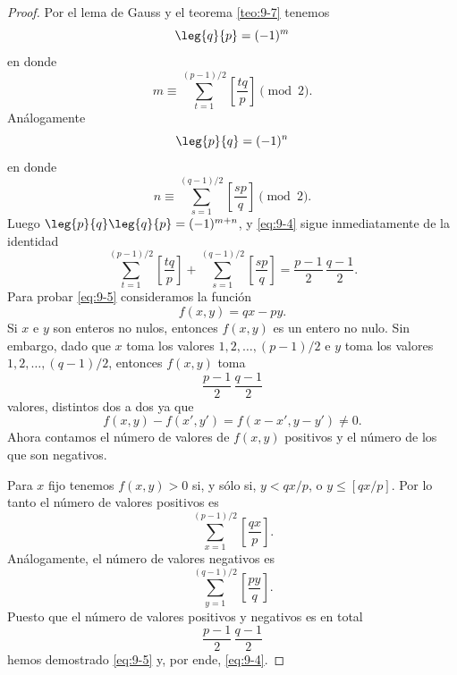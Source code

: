 \documentclass[12pt,a4paper]{book}
\begin{document}
    \begin{proof}
        Por el lema de Gauss y el teorema \ref{teo:9-7} tenemos
        \begin{equation*}
            \leg{q}{p}=(-1)^{m}
        \end{equation*}
        en donde
        \begin{equation*}
            m\equiv\sum_{t=1}^{(p-1)/2}\left[\frac{tq}{p}\right]\pmod{2}.
        \end{equation*}
        Análogamente
        \begin{equation*}
            \leg{p}{q}=(-1)^{n}
        \end{equation*}
        en donde
        \begin{equation*}
            n\equiv\sum_{s=1}^{(q-1)/2}\left[\frac{sp}{q}\right]\pmod{2}.
        \end{equation*}
        Luego $\leg{p}{q}\leg{q}{p}=(-1)^{m+n}$, y \eqref{eq:9-4} sigue inmediatamente de la
        identidad
        \begin{equation}\label{eq:9-5}
            \sum_{t=1}^{(p-1)/2}\left[\frac{tq}{p}\right]+\sum_{s=1}^{(q-1)/2}\left[\frac{sp}{q}\right]=\frac{p-1}{2}\,\frac{q-1}{2}.
        \end{equation}
        Para probar \eqref{eq:9-5} consideramos la función
        \begin{equation*}
            f(x,y)=qx-py.
        \end{equation*}
        Si $x$ e $y$ son enteros no nulos, entonces $f(x,y)$ es un entero no nulo. Sin
        embargo, dado que $x$ toma los valores $1,2,\dots,(p-1)/2$ e $y$ toma los valores
        $1,2,\dots,(q-1)/2$, entonces $f(x,y)$ toma
        \begin{equation*}
            \frac{p-1}{2}\,\frac{q-1}{2}
        \end{equation*}
        valores, distintos dos a dos ya que
        \begin{equation*}
            f(x,y)-f(x',y')=f(x-x',y-y')\neq0.
        \end{equation*}
        Ahora contamos el número de valores de $f(x,y)$ positivos y el número de los que
        son negativos.

        Para $x$ fijo tenemos $f(x,y)>0$ si, y sólo si, $y<qx/p$, o $y\leq[qx/p]$. Por lo
        tanto el número de valores positivos es
        \begin{equation*}
            \sum_{x=1}^{(p-1)/2}\left[\frac{qx}{p}\right].
        \end{equation*}
        Análogamente, el número de valores negativos es
        \begin{equation*}
            \sum_{y=1}^{(q-1)/2}\left[\frac{py}{q}\right].
        \end{equation*}
        Puesto que el número de valores positivos y negativos es en total
        \begin{equation*}
            \frac{p-1}{2}\,\frac{q-1}{2}
        \end{equation*}
        hemos demostrado \eqref{eq:9-5} y, por ende, \eqref{eq:9-4}.
    \end{proof}
\end{document}
